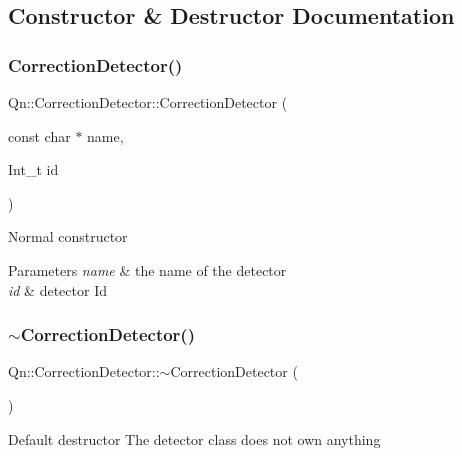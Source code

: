\subsection{Constructor \& Destructor Documentation}
\mbox{\label{classQn_1_1CorrectionDetector_a50aa008a5c92d7773d8b9851806ddb19}} 
\subsubsection{\texorpdfstring{Correction\+Detector()}{CorrectionDetector()}}
{\footnotesize\ttfamily Qn\+::\+Correction\+Detector\+::\+Correction\+Detector (\begin{DoxyParamCaption}\item[{const char $\ast$}]{name,  }\item[{Int\+\_\+t}]{id }\end{DoxyParamCaption})}

Normal constructor 
\begin{DoxyParams}{Parameters}
{\em name} & the name of the detector \\
\hline
{\em id} & detector Id \\
\hline
\end{DoxyParams}
\mbox{\label{classQn_1_1CorrectionDetector_a90e172fc836adae967b808cb75be3ca3}} 
\subsubsection{\texorpdfstring{$\sim$\+Correction\+Detector()}{~CorrectionDetector()}}
{\footnotesize\ttfamily Qn\+::\+Correction\+Detector\+::$\sim$\+Correction\+Detector (\begin{DoxyParamCaption}{ }\end{DoxyParamCaption})\hspace{0.3cm}{\ttfamily [virtual]}}

Default destructor The detector class does not own anything 

